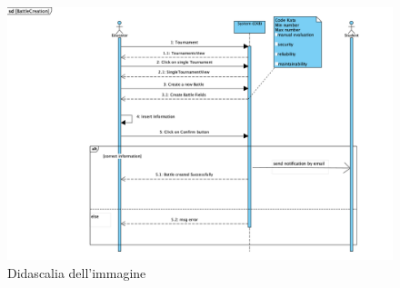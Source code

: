     \begin{figure}[H]
  \includegraphics[width=1\linewidth]{SequenceDiagram/BattleCreation.png} 
  \caption{Didascalia dell'immagine}
  \label{fig:immagine}
\end{figure}

